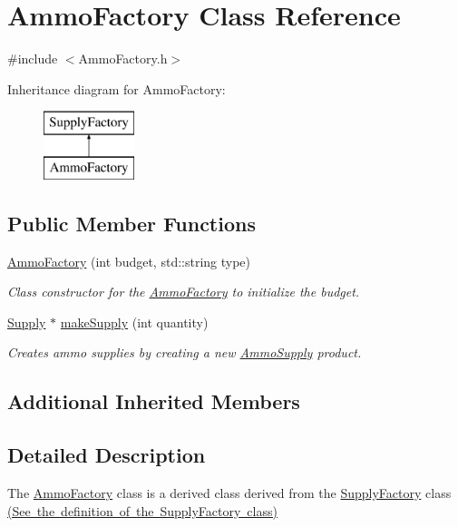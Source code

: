 \hypertarget{class_ammo_factory}{}\section{Ammo\+Factory Class Reference}
\label{class_ammo_factory}


{\ttfamily \#include $<$Ammo\+Factory.\+h$>$}

Inheritance diagram for Ammo\+Factory\+:\begin{figure}[H]
\begin{center}
\leavevmode
\includegraphics[height=2.000000cm]{class_ammo_factory}
\end{center}
\end{figure}
\subsection*{Public Member Functions}
\begin{DoxyCompactItemize}
\item 
\mbox{\hyperlink{class_ammo_factory_aab95615266049285e200316183a7f15e}{Ammo\+Factory}} (int budget, std\+::string type)
\begin{DoxyCompactList}\small\item\em Class constructor for the \mbox{\hyperlink{class_ammo_factory}{Ammo\+Factory}} to initialize the budget. \end{DoxyCompactList}\item 
\mbox{\hyperlink{class_supply}{Supply}} $\ast$ \mbox{\hyperlink{class_ammo_factory_a8d2b1cb24f145547af1de2d051f0e02c}{make\+Supply}} (int quantity)
\begin{DoxyCompactList}\small\item\em Creates ammo supplies by creating a new \mbox{\hyperlink{class_ammo_supply}{Ammo\+Supply}} product. \end{DoxyCompactList}\end{DoxyCompactItemize}
\subsection*{Additional Inherited Members}


\subsection{Detailed Description}
The \mbox{\hyperlink{class_ammo_factory}{Ammo\+Factory}} class is a derived class derived from the \mbox{\hyperlink{class_supply_factory}{Supply\+Factory}} class \mbox{\hyperlink{_supply_factory_8h_source}{(See the definition of the Supply\+Factory class)}}


